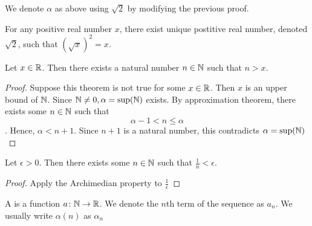 \documentclass[11pt]{article}
\begin{document}
\begin{remark}
    We denote \(\alpha\) as above using \(\sqrt{2}\) by modifying the previous proof.
\end{remark}

\begin{theorem}
    For any positive real number \(x\), there exist unique postitive real number, denoted \(\sqrt{2}\), such that \((\sqrt{x})^2 = x\).
\end{theorem}

\begin{theorem}
    Let \(x \in \mathbb R\). Then there exists a natural number \(n \in \mathbb N\) such that \(n > x\).
\end{theorem}

\begin{proof}
    Suppose this theorem is not true for some \(x \in \mathbb R\). Then \(x\) is an upper bound of \(\mathbb N\). Since \(\mathbb N \neq 0, \alpha = \sup(\mathbb N)\) exists. By approximation theorem, there exists some \(n \in \mathbb N\) such that \[\alpha - 1< n \leqslant \alpha \]. Hence, \(\alpha < n +1\). Since \(n + 1\) is a natural number, this contradicts \(\alpha = \sup(\mathbb N)\)
\end{proof}
\begin{corollary}
    Let \(\epsilon > 0\). Then there exists some \(n \in \mathbb N\) such that \(\frac{1}{n} < \epsilon\).
\end{corollary}
\begin{proof}
    Apply the Archimedian property to \(\frac{1}{\epsilon}\)
\end{proof}

\begin{definition} 
    A  is a function \(a \colon \mathbb N \to \mathbb R\). We denote the \(n\)th term of the sequence as \(a_n\). We usually write \(\alpha(n)\) as \(\alpha_n\)
\end{definition}
\end{document}
